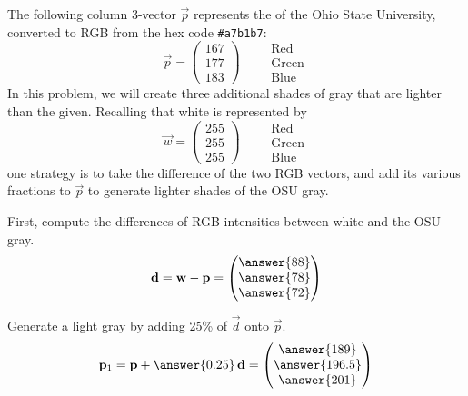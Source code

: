 \documentclass{ximera}
\author{Tae Eun Kim}
\begin{document}
\begin{exercise}
  The following column
  3-vector $\vec{p}$ represents the  of the Ohio State
  University, converted to RGB from the hex code \verb|#a7b1b7|:
  \[
    \vec{p} = \begin{pmatrix}
      167\\ 177\\ 183
    \end{pmatrix}
    \qquad
    \begin{array}{l}
      \text{Red}\\
      \text{Green}\\
      \text{Blue}
    \end{array}
  \]
  In this problem, we will create three additional shades of gray that are
  lighter than the given. Recalling that white is represented by
  \[
    \vec{w} = \begin{pmatrix}
      255\\ 255\\ 255
    \end{pmatrix}
    \qquad
    \begin{array}{l}
      \text{Red}\\
      \text{Green}\\
      \text{Blue}
    \end{array}
  \]
  one strategy is to take the difference of the two RGB vectors, and
  add its various fractions to $\vec{p}$ to generate lighter shades of
  the OSU gray.

  First, compute the differences of RGB intensities between white and the OSU
  gray.
  \[
    \vec{d} = \vec{w} - \vec{p} =
    \begin{pmatrix}
      \answer{88}\\
      \answer{78}\\
      \answer{72}
    \end{pmatrix}
  \]

  Generate a light gray by adding 25\% of $\vec{d}$ onto $\vec{p}$.
  \[
    \vec{p}_1 = \vec{p} + \answer{0.25}\,\vec{d} =
    \begin{pmatrix}
      \answer{189}\\
      \answer{196.5}\\
      \answer{201}
    \end{pmatrix}
  \]


\end{exercise}
\end{document}
